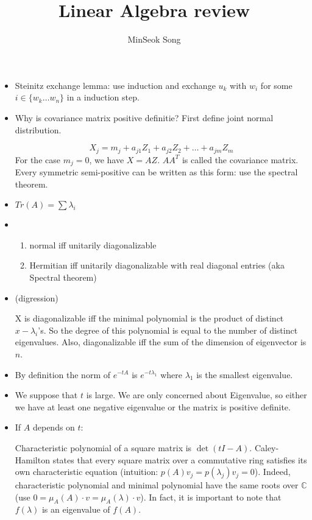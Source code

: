 \documentclass{article}
\title{Linear Algebra review}
\author{MinSeok Song}
\date{}
\theoremstyle{remark}
\begin{document}
\maketitle
\begin{itemize}
\textbf{Rank Nullity Theorem}

Let $T:V\to W$ be a linear transformation between two vector spaces. Then $Rank (T)+Nullity(T)=dim(V)$.
(this can be easily shown by using first isomorphism theorem and splitting lemma(check))
\begin{proof}
Another method is to compare Nullity(T) and dim(V), and apply Steinitz exchange lemma to find the dimension of the image.
\end{proof}
\item Steinitz exchange lemma: use induction and exchange $u_k$ with $w_i$ for some $i\in\{w_k\dots w_n\}$ in a induction step.
\item Why is covariance matrix positive definitie?
First define joint normal distribution. 

$$X_j=m_j+a_{j1}Z_1+a_{j2}Z_2+\dots+a_{jm}Z_m$$
For the case $m_j=0$, we have $X=AZ$. $AA^T$ is called the covariance matrix. Every symmetric semi-positive can be written as this form: use the spectral theorem.

\item $Tr(A)=\sum \lambda_i$
\item 
\begin{enumerate}
\item normal iff unitarily diagonalizable
\item Hermitian iff unitarily diagonalizable with real diagonal entries (aka Spectral theorem)
\end{enumerate}
\item (digression) 

X is diagonalizable iff the minimal polynomial is the product of distinct $x-\lambda_i$'s. So the degree of this polynomial is equal to the number of distinct eigenvalues. Also, diagonalizable iff the sum of the dimension of eigenvector is $n$.
\item By definition the norm of $e^{-tA}$ is $e^{-t\lambda_1}$ where $\lambda_1$ is the smallest eigenvalue.
\item We suppose that $t$ is large. We are only concerned about Eigenvalue, so either we have at least one negative eigenvalue or the matrix is positive definite.
\item If $A$ depends on $t$: 

Characteristic polynomial of a square matrix is $\det(tI-A)$. Caley-Hamilton states that every square matrix over a commutative ring satisfies its own characteristic equation (intuition: $p(A)v_j=p(\lambda_j)v_j=0$). Indeed, characteristic polynomial and minimal polynomial have the same roots over $\mathbb{C}$ (use $0=\mu_A (A)\cdot v=\mu_A (\lambda)\cdot v$). In fact, it is important to note that $f(\lambda)$ is an eigenvalue of $f(A)$.


\end{itemize}
\end{document}
